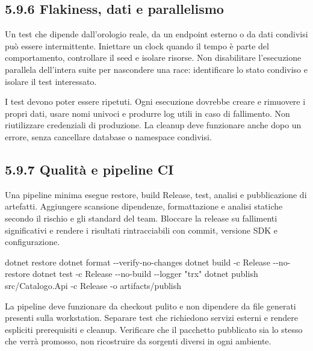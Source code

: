 \documentclass[
  italian,
  10pt,
]{book}
\newenvironment{Shaded}{\begin{snugshade}}{\end{snugshade}}
\newcommand{\NormalTok}[1]{#1}
\begin{document}
\subsection{5.9.6 Flakiness, dati e
parallelismo}\label{flakiness-dati-e-parallelismo}

Un test che dipende dall'orologio reale, da un endpoint esterno o da
dati condivisi può essere intermittente. Iniettare un clock quando il
tempo è parte del comportamento, controllare il seed e isolare risorse.
Non disabilitare l'esecuzione parallela dell'intera suite per nascondere
una race: identificare lo stato condiviso e isolare il test interessato.

I test devono poter essere ripetuti. Ogni esecuzione dovrebbe creare e
rimuovere i propri dati, usare nomi univoci e produrre log utili in caso
di fallimento. Non riutilizzare credenziali di produzione. La cleanup
deve funzionare anche dopo un errore, senza cancellare database o
namespace condivisi.

\subsection{5.9.7 Qualità e pipeline CI}\label{qualituxe0-e-pipeline-ci}

Una pipeline minima esegue restore, build Release, test, analisi e
pubblicazione di artefatti. Aggiungere scansione dipendenze,
formattazione e analisi statiche secondo il rischio e gli standard del
team. Bloccare la release su fallimenti significativi e rendere i
risultati rintracciabili con commit, versione SDK e configurazione.

\begin{Shaded}
\begin{Highlighting}[]
\NormalTok{dotnet restore}
\NormalTok{dotnet format {-}{-}verify{-}no{-}changes}
\NormalTok{dotnet build {-}c Release {-}{-}no{-}restore}
\NormalTok{dotnet test {-}c Release {-}{-}no{-}build {-}{-}logger "trx"}
\NormalTok{dotnet publish src/Catalogo.Api {-}c Release {-}o artifacts/publish}
\end{Highlighting}
\end{Shaded}

La pipeline deve funzionare da checkout pulito e non dipendere da file
generati presenti sulla workstation. Separare test che richiedono
servizi esterni e rendere espliciti prerequisiti e cleanup. Verificare
che il pacchetto pubblicato sia lo stesso che verrà promosso, non
ricostruire da sorgenti diversi in ogni ambiente.
\end{document}
